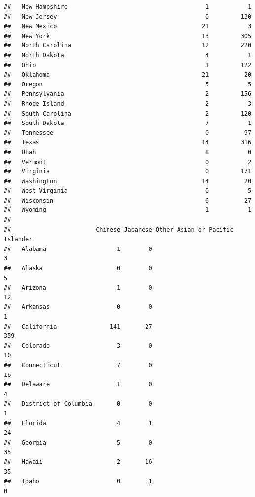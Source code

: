 \documentclass[]{book}
\theoremstyle{definition}
\theoremstyle{definition}
\theoremstyle{definition}
\theoremstyle{remark}
\begin{document}
\begin{verbatim}
##   New Hampshire                                       1           1
##   New Jersey                                          0         130
##   New Mexico                                         21           3
##   New York                                           13         305
##   North Carolina                                     12         220
##   North Dakota                                        4           1
##   Ohio                                                1         122
##   Oklahoma                                           21          20
##   Oregon                                              5           5
##   Pennsylvania                                        2         156
##   Rhode Island                                        2           3
##   South Carolina                                      2         120
##   South Dakota                                        7           1
##   Tennessee                                           0          97
##   Texas                                              14         316
##   Utah                                                8           0
##   Vermont                                             0           2
##   Virginia                                            0         171
##   Washington                                         14          20
##   West Virginia                                       0           5
##   Wisconsin                                           6          27
##   Wyoming                                             1           1
##                       
##                        Chinese Japanese Other Asian or Pacific Islander
##   Alabama                    1        0                               3
##   Alaska                     0        0                               5
##   Arizona                    1        0                              12
##   Arkansas                   0        0                               1
##   California               141       27                             359
##   Colorado                   3        0                              10
##   Connecticut                7        0                              16
##   Delaware                   1        0                               4
##   District of Columbia       0        0                               1
##   Florida                    4        1                              24
##   Georgia                    5        0                              35
##   Hawaii                     2       16                              35
##   Idaho                      0        1                               0

\end{verbatim}
\end{document}
